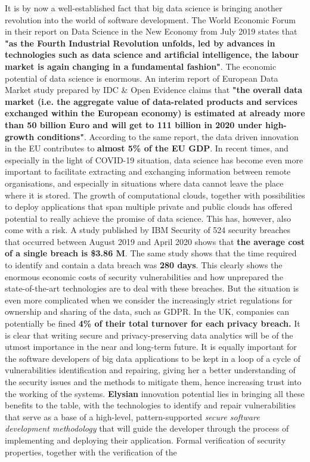 \documentclass[a4paper,11pt]{article}
\newcommand{\project}[1]{\textbf{#1}\xspace}
\newcommand{\SECURITY}{\project{Elysian}}
\newcommand{\TheProject}{\SECURITY}
\begin{document}

It is by now a well-established fact that big data science is bringing another revolution into the world of software development. The World Economic Forum in their report on Data Science in the New Economy from July 2019 states that \textbf{"as the Fourth Industrial Revolution unfolds, led by advances in technologies such as data science and artificial intelligence, the labour market is again changing in a fundamental fashion"}. The economic potential of data science is enormous. An interim report of European Data Market study prepared by IDC \& Open Evidence claims that \textbf{"the overall data market (i.e. the aggregate value of data-related products and services exchanged within the European economy) is estimated at already more than 50 billion Euro and will get to 111 billion in 2020 under high-growth conditions"}. According to the same report, the data driven innovation in the EU contributes to \textbf{almost 5\% of the EU GDP}. In recent times, and especially in the light of COVID-19 situation, data science has become even more important to facilitate extracting and exchanging information between remote organisations, and especially in situations where data cannot leave the place where it is stored. The growth of computational clouds, together with possibilities to deploy applications that span multiple private and public clouds has offered potential to really achieve the promise of data science. This has, however, also come with a risk. A study published by IBM Security of 524 security breaches that occurred between August 2019 and April 2020 shows that \textbf{the average cost of a single breach is \$3.86 M}. The same study shows that the time required to identify and contain a data breach was \textbf{280 days}. This clearly shows the enormous economic costs of security vulnerabilities and how unprepared the state-of-the-art technologies are to deal with these breaches. But the situation is even more complicated when we consider the increasingly strict regulations for ownership and sharing of the data, such as GDPR. In the UK, companies can potentially be fined \textbf{4\% of their total turnover for each privacy breach.} It is clear that writing secure and privacy-preserving data analytics will be of the utmost importance in the near and long-term future. It is equally important for the software developers of big data applications to be kept in a loop of a cycle of vulnerabilities identification and repairing, giving her a better understanding of the security issues and the methods to mitigate them, hence increasing trust into the working of the systems. \TheProject{} innovation potential lies in bringing all these benefits to the table, with the technologies to identify and repair vulnerabilities that serve as a base of a high-level, pattern-supported \emph{secure software development methodology} that will guide the developer through the process of implementing and deploying their application. Formal verification of security properties, together with the verification of the 
\end{document}
